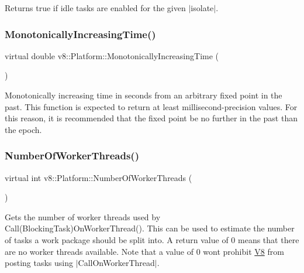 Returns true if idle tasks are enabled for the given $\vert$isolate$\vert$. \mbox{\label{classv8_1_1Platform_a6d4d7c2dcf6b0c7113099b97fa7f57b7}} 
\subsubsection{\texorpdfstring{Monotonically\+Increasing\+Time()}{MonotonicallyIncreasingTime()}}
{\footnotesize\ttfamily virtual double v8\+::\+Platform\+::\+Monotonically\+Increasing\+Time (\begin{DoxyParamCaption}{ }\end{DoxyParamCaption})\hspace{0.3cm}{\ttfamily [pure virtual]}}

Monotonically increasing time in seconds from an arbitrary fixed point in the past. This function is expected to return at least millisecond-\/precision values. For this reason, it is recommended that the fixed point be no further in the past than the epoch. \mbox{\label{classv8_1_1Platform_a57cdd7eb4c482bfb806c378beeda716d}} 
\subsubsection{\texorpdfstring{Number\+Of\+Worker\+Threads()}{NumberOfWorkerThreads()}}
{\footnotesize\ttfamily virtual int v8\+::\+Platform\+::\+Number\+Of\+Worker\+Threads (\begin{DoxyParamCaption}{ }\end{DoxyParamCaption})\hspace{0.3cm}{\ttfamily [pure virtual]}}

Gets the number of worker threads used by Call(\+Blocking\+Task)On\+Worker\+Thread(). This can be used to estimate the number of tasks a work package should be split into. A return value of 0 means that there are no worker threads available. Note that a value of 0 won\textquotesingle{}t prohibit \mbox{\hyperlink{classv8_1_1V8}{V8}} from posting tasks using $\vert$\+Call\+On\+Worker\+Thread$\vert$. \mbox{\label{classv8_1_1Platform_a7ed41bddc1d1ebe51c55539198d0026e}} 
